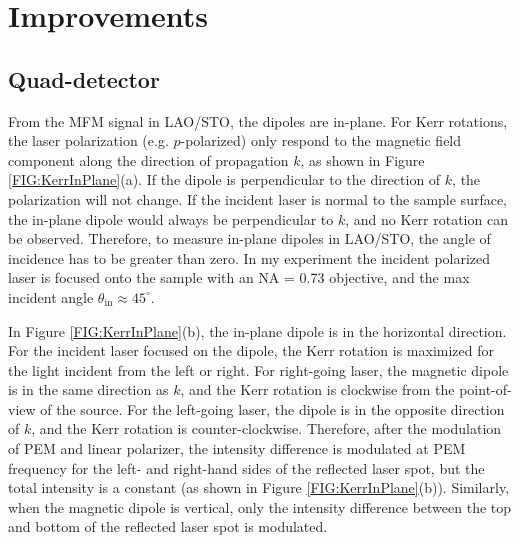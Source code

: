 \documentclass[pdflatex, sectionletters, 12pt]{pittetd}    %
\begin{document}
\section{Improvements}

\subsection{Quad-detector}

From the MFM signal in LAO/STO, the dipoles are in-plane. For Kerr rotations, the laser polarization (e.g. $p$-polarized) only respond to the magnetic field component along the direction of propagation $k$, as shown in Figure \ref{FIG:KerrInPlane}(a). If the dipole is perpendicular to the direction of $k$, the polarization will not change. If the incident laser is normal to the sample surface, the in-plane dipole would always be perpendicular to $k$, and no Kerr rotation can be observed. Therefore, to measure in-plane dipoles in LAO/STO, the angle of incidence has to be greater than zero. In my experiment the incident polarized laser is focused onto the sample with an NA = 0.73 objective, and the max incident angle $\theta_\mathrm{in} \approx 45^{\circ}$.  

In Figure \ref{FIG:KerrInPlane}(b), the in-plane dipole is in the horizontal direction. For the incident laser focused on the dipole, the Kerr rotation is maximized for the light incident from the left or right. For right-going laser, the magnetic dipole is in the same direction as $k$, and the Kerr rotation is clockwise from the point-of-view of the source. For the left-going laser, the dipole is in the opposite direction of $k$, and the Kerr rotation is counter-clockwise. Therefore, after the modulation of PEM and linear polarizer, the intensity difference is modulated at PEM frequency for the left- and right-hand sides of the reflected laser spot, but the total intensity is a constant (as shown in Figure \ref{FIG:KerrInPlane}(b)). Similarly, when the magnetic dipole is vertical, only the intensity difference between the top and bottom of the reflected laser spot is modulated. 
\end{document}
